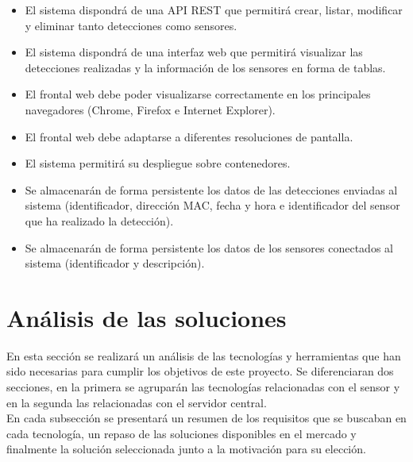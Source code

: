 \documentclass[../proyecto.tex]{subfiles}
\begin{document}
\begin{itemize}
  \item El sistema dispondrá de una API REST que permitirá crear, listar, modificar y eliminar tanto detecciones como sensores.
  \item El sistema dispondrá de una interfaz web que permitirá visualizar las detecciones realizadas y la información de los sensores en forma de tablas.
\end{itemize}

\begin{itemize}
  \item El frontal web debe poder visualizarse correctamente en los principales navegadores (Chrome, Firefox e Internet Explorer).
  \item El frontal web debe adaptarse a diferentes resoluciones de pantalla.
  \item El sistema permitirá su despliegue sobre contenedores.
\end{itemize}


\begin{itemize}
  \item Se almacenarán de forma persistente los datos de las detecciones enviadas al sistema (identificador, dirección MAC, fecha y hora e identificador del sensor que ha realizado la detección).
  \item Se almacenarán de forma persistente los datos de los sensores conectados al sistema (identificador y descripción).
\end{itemize}


\section{Análisis de las soluciones}
En esta sección se realizará un análisis de las tecnologías y herramientas que han sido necesarias para cumplir los objetivos de este proyecto. Se diferenciaran dos secciones, en la primera se agruparán las tecnologías relacionadas con el sensor y en la segunda las relacionadas con el servidor central.\\

En cada subsección se presentará un resumen de los requisitos que se buscaban en cada tecnología, un repaso de las soluciones disponibles en el mercado y finalmente la solución seleccionada junto a la motivación para su elección.\\
\end{document}
